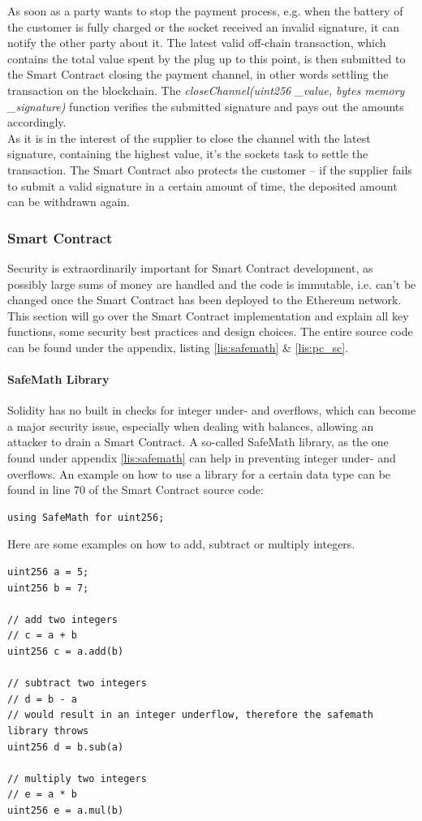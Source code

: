 As soon as a party wants to stop the payment process, e.g. when the battery of the customer is fully charged or the socket received an invalid signature, it can notify the other party about it. The latest valid off-chain transaction, which contains the total value spent by the plug up to this point, is then submitted to the Smart Contract closing the payment channel, in other words settling the transaction on the blockchain. The \textit{closeChannel(uint256 \_value, bytes memory \_signature)} function verifies the submitted signature and pays out the amounts accordingly.
\\
As it is in the interest of the supplier to close the channel with the latest signature, containing the highest value, it’s the sockets task to settle the transaction. The Smart Contract also protects the customer – if the supplier fails to submit a valid signature in a certain amount of time, the deposited amount can be withdrawn again.
\newpage
\subsubsection{Smart Contract}
Security is extraordinarily important for Smart Contract development, as possibly large sums of money are handled and the code is immutable, i.e. can’t be changed once the Smart Contract has been deployed to the Ethereum network. This section will go over the Smart Contract implementation and explain all key functions, some security best practices and design choices. The entire source code can be found under the appendix, listing \ref{lis:safemath} \& \ref{lis:pc_sc}.
\paragraph{SafeMath Library}
Solidity has no built in checks for integer under- and overflows, which can become a major security issue, especially when dealing with balances, allowing an attacker to drain a Smart Contract. A so-called SafeMath library, as the one found under appendix \ref{lis:safemath} can help in preventing integer under- and overflows.
An example on how to use a library for a certain data type can be found in line 70 of the Smart Contract source code:
\begin{lstlisting}[language=Solidity, caption={Using the SafeMath library}, label={lis:safemath_use}, firstnumber=70]
using SafeMath for uint256;
\end{lstlisting}
Here are some examples on how to add, subtract or multiply integers.
\begin{lstlisting}[language=Solidity, caption={Examples for SafeMath calculations}, label={lis:safemath_example}]
uint256 a = 5;
uint256 b = 7;

// add two integers
// c = a + b
uint256 c = a.add(b)

// subtract two integers
// d = b - a
// would result in an integer underflow, therefore the safemath library throws
uint256 d = b.sub(a)

// multiply two integers
// e = a * b
uint256 e = a.mul(b)
\end{lstlisting}
\leavevmode
\\
